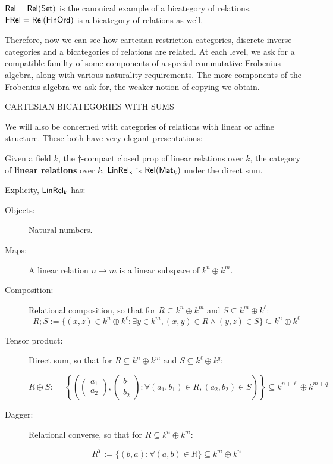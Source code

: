 \begin{example}
$\mathsf{Rel}=\mathsf{Rel}(\mathsf{Set})$ is the canonical example of a bicategory of relations.  $\mathsf{FRel}=\mathsf{Rel}(\mathsf{FinOrd})$ is a bicategory of relations as well.
\end{example}

Therefore, now we can see how cartesian restriction categories,  discrete inverse categories and a bicategories of relations are related.  At each level, we ask for a compatible familty of some components of a special commutative Frobenius algebra, along with various naturality requirements.  The more components of the Frobenius algebra we ask for, the weaker notion of copying we obtain.


CARTESIAN BICATEGORIES WITH SUMS


We will also be concerned with categories of relations with linear or affine structure.  These both have very elegant presentations:


\begin{definition}
Given a field $k$, the $\dag$-compact closed prop of linear relations over $k$, the category of {\bf linear relations} over $k$, $\sf LinRel_{k}$ is $\mathsf{Rel}(\mathsf{Mat}_k)$ under the direct sum.

Explicity, $\sf LinRel_{k}$ has:

\begin{description}
\item[Objects:] Natural numbers.

\item[Maps:] A linear relation $n\to m$ is a linear subspace of $k^n \oplus k^m$.

\item[Composition:] Relational composition, so that for $R \subseteq k^n \oplus k^m$  and $S \subseteq k^m \oplus k^\ell$:
$$
R;S := \{  (x,z) \in k^{n} \oplus k^{\ell} : \exists y \in k^{m}, (x,y) \in R \wedge (y,z) \in S \} \subseteq k^n \oplus k^\ell
$$ 

\item[Tensor product:] Direct sum, so that for $R \subseteq k^n \oplus k^m$ and $S \subseteq k^\ell \oplus k^q$:

$$R\oplus S : =
\left\{
\left(
\begin{pmatrix}
a_1\\a_2
\end{pmatrix},
\begin{pmatrix}
b_1\\b_2
\end{pmatrix}
:
\forall (a_1,b_1) \in R, (a_2,b_2) \in S
\right)
\right\} \subseteq k^{n+\ell}\oplus k^{m+q}
$$

\item[Dagger:] Relational converse, so that for $R \subseteq k^{n}\oplus k^m$:

$$
R^T := \{ (b,a) : \forall (a,b) \in R \} \subseteq k^{m} \oplus k^n
$$
\end{description}
\end{definition}



